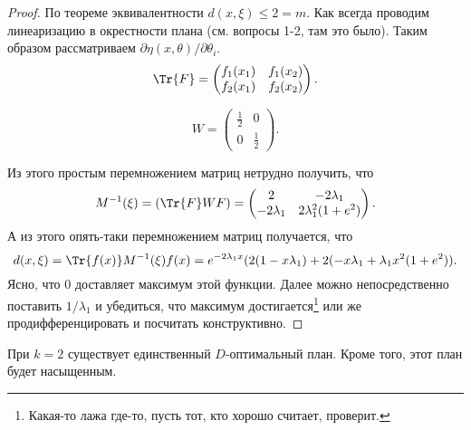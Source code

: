 \begin{proof}
По теореме эквивалентности $d(x, \xi) \leq 2 = m$.
Как всегда проводим линеаризацию в окрестности плана (см. вопросы 1-2, там это было).
Таким образом рассматриваем $\partial \eta(x, \theta) / \partial \theta_i$.
$$\Tr{F} = \begin{pmatrix} f_1(x_1) & f_1(x_2) \\ f_2(x_1) & f_2(x_2)\end{pmatrix}.$$

$$ W = \begin{pmatrix} \frac{1}{2} & 0 \\ 0 & \frac{1}{2} \end{pmatrix}.$$

Из этого простым перемножением матриц нетрудно получить, что
$$ M^{-1}(\xi) = (\Tr{F} W F) = \begin{pmatrix} 2 & -2\lambda_1 \\  -2\lambda_1 & 2 \lambda_1^2 (1 + e^2) \end{pmatrix}.$$
А из этого опять-таки перемножением матриц получается, что
$$ d(x, \xi) = \Tr{f(x)} M^{-1}(\xi) f(x) = e^{-2\lambda_1 x} (2 (1 - x \lambda_1) + 2(-x\lambda_1 + \lambda_1 x^2(1 +e^2)).$$
Ясно, что $0$ доставляет максимум этой функции. Далее можно непосредственно поставить $1 / \lambda_1$ и убедиться, что максимум достигается\footnote{\color{blue} Какая-то лажа где-то, пусть тот, кто хорошо считает, проверит.}
или же продифференцировать и посчитать конструктивно.
\end{proof}

\begin{thm}
При $k=2$ существует единственный $D$-оптимальный план. Кроме того, этот план будет насыщенным.
\end{thm}
